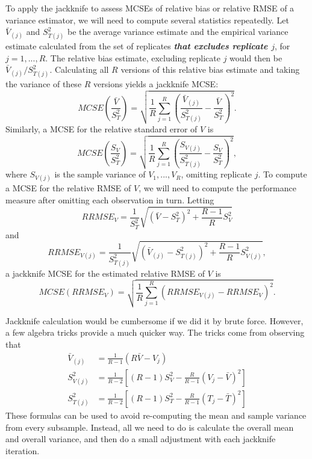 \documentclass[
]{book}
\begin{document}
To apply the jackknife to assess MCSEs of relative bias or relative RMSE of a variance estimator, we will need to compute several statistics repeatedly.
Let \(\bar{V}_{(j)}\) and \(S_{T(j)}^2\) be the average variance estimate and the empirical variance estimate calculated from the set of replicates \textbf{\emph{that excludes replicate \(j\)}}, for \(j = 1,...,R\).
The relative bias estimate, excluding replicate \(j\) would then be \(\bar{V}_{(j)} / S_{T(j)}^2\).
Calculating all \(R\) versions of this relative bias estimate and taking the variance of these \(R\) versions yields a jackknife MCSE:
\[
MCSE\left( \frac{ \bar{V}}{S_T^2} \right) = \sqrt{\frac{1}{R} \sum_{j=1}^R \left(\frac{\bar{V}_{(j)}}{S_{T(j)}^2} - \frac{\bar{V}}{S_T^2}\right)^2}.
\label{eq:MCSE-relative-bias-V}
\]
Similarly, a MCSE for the relative standard error of \(V\) is
\[
MCSE\left( \frac{ S_V}{S_T^2} \right) = \sqrt{\frac{1}{R} \sum_{j=1}^R \left(\frac{S_{V(j)}}{S_{T(j)}^2} - \frac{S_V}{S_T^2}\right)^2},
\label{eq:MCSE-relative-var-V}
\]
where \(S_{V(j)}\) is the sample variance of \(V_1,...,V_R\), omitting replicate \(j\).
To compute a MCSE for the relative RMSE of \(V\), we will need to compute the performance measure after omitting each observation in turn.
Letting
\[
RRMSE_{V} = \frac{1}{S_{T}^2}\sqrt{(\bar{V} - S_{T}^2)^2 + \frac{R - 1}{R} S_{V}^2}
\]
and
\[
RRMSE_{V(j)} = \frac{1}{S_{T(j)}^2}\sqrt{(\bar{V}_{(j)} - S_{T(j)}^2)^2 + \frac{R - 1}{R} S_{V(j)}^2},
\]
a jackknife MCSE for the estimated relative RMSE of \(V\) is
\[
MCSE\left( RRMSE_{V} \right) = \sqrt{\frac{1}{R} \sum_{j=1}^R \left(RRMSE_{V(j)} - RRMSE_{V}\right)^2}.
\label{eq:MCSE-relative-rmse-V}
\]

Jackknife calculation would be cumbersome if we did it by brute force. However, a few algebra tricks provide a much quicker way. The tricks come from observing that
\[
\begin{aligned}
\bar{V}_{(j)} &= \frac{1}{R - 1}\left(R \bar{V} - V_j\right) \\
S_{V(j)}^2 &= \frac{1}{R - 2} \left[(R - 1) S_V^2 - \frac{R}{R - 1}\left(V_j - \bar{V}\right)^2\right] \\
S_{T(j)}^2 &= \frac{1}{R - 2} \left[(R - 1) S_T^2 - \frac{R}{R - 1}\left(T_j - \bar{T}\right)^2\right]
\end{aligned}
\]
These formulas can be used to avoid re-computing the mean and sample variance from every subsample.
Instead, all we need to do is calculate the overall mean and overall variance, and then do a small adjustment with each jackknife iteration.
\end{document}
